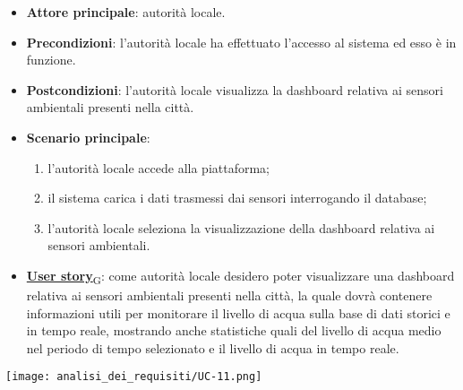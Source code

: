 \begin{itemize}
	\item \textbf{Attore principale}: autorità locale.
	\item \textbf{Precondizioni}: l'autorità locale ha effettuato l'accesso al sistema ed esso è in funzione.
	\item \textbf{Postcondizioni}: l'autorità locale visualizza la dashboard relativa
	      ai sensori ambientali presenti nella città.
	\item \textbf{Scenario principale}:
	      \begin{enumerate}
		      \item l'autorità locale accede alla piattaforma;
		      \item il sistema carica i dati trasmessi dai sensori interrogando il database;
		      \item l'autorità locale seleziona la visualizzazione della dashboard relativa ai sensori ambientali.
	      \end{enumerate}
	\item \href{https://7last.github.io/docs/pb/documentazione-interna/glossario\#user-story}{\textbf{User story}\textsubscript{G}}:
	      come autorità locale desidero poter visualizzare una dashboard relativa ai sensori ambientali presenti nella città, la quale
	      dovrà contenere informazioni utili per monitorare il livello di acqua sulla base di dati storici e in tempo reale, mostrando
	      anche statistiche quali del livello di acqua medio nel periodo di tempo selezionato e il livello di acqua in tempo reale.
\end{itemize}
\begin{center}
	\texttt{[image: analisi\_dei\_requisiti/UC-11.png]}
\end{center}


